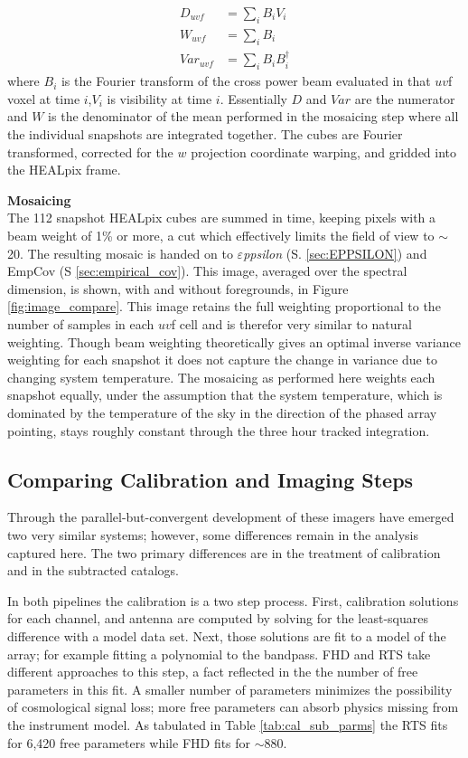\documentclass[twolcolumn,iop]{emulateapj}
\def\eppsilon{{\it $\varepsilon$ppsilon}}
\def\empirical{EmpCov}
\begin{document}
\begin{equation}
\label{eq:weight_accumulation}
\begin{split}
D_{uvf} &= \sum_i B_i V_i\\
W_{uvf} &= \sum_i B_i\\
Var_{uvf} &= \sum_i B_i B_i^\dag
\end{split}
\end{equation}
where $B_i$ is the Fourier transform of the cross power beam evaluated in that $uv$f voxel at time $i$,$V_i$ is visibility at time $i$. Essentially $D$ and $Var$ are the numerator and $W$ is the denominator of the mean performed in the mosaicing step where all the individual snapshots are integrated together.  The cubes are Fourier transformed, corrected for the $w$ projection coordinate warping, and gridded into the HEALpix frame.

{\bf Mosaicing}\\
 The 112 snapshot HEALpix cubes are summed in time, keeping pixels with a beam weight of 1\% or more, a cut which effectively limits the field of view to $\sim$20\arcdeg. The resulting mosaic is handed on to \eppsilon{} (S. \ref{sec:EPPSILON}) and  \empirical{} (S \ref{sec:empirical_cov}).  This image, averaged over the spectral dimension, is shown, with and without foregrounds, in Figure \ref{fig:image_compare}. This image retains the full weighting proportional to the number of samples in each $uv$f cell and is therefor very similar to natural weighting. Though beam weighting theoretically gives an optimal inverse variance weighting for each snapshot it does not capture the change in variance due to changing system temperature. The mosaicing as performed here weights each snapshot equally, under the assumption that the system temperature, which is dominated by the temperature of the sky in the direction of the phased array pointing, stays roughly constant through the three hour tracked integration.



\subsection{Comparing Calibration and Imaging Steps}
\label{sec:comparing_imaging}
Through the parallel-but-convergent development of these imagers have emerged two very similar systems; however, some differences remain in the analysis captured here. The two primary differences are in the treatment of calibration and in the subtracted catalogs.  

In both pipelines the calibration is a two step process. First, calibration solutions for each channel, and antenna are computed by solving for the least-squares difference with a model data set. Next, those solutions are fit to a model of the array; for example fitting a polynomial to the bandpass. FHD and RTS take different approaches to this step, a fact reflected in the the number of free parameters in this fit. A smaller number of parameters minimizes the possibility of cosmological signal loss; more free parameters can absorb physics missing from the instrument model.  As tabulated in Table \ref{tab:cal_sub_parms} the RTS fits for 6,420 free parameters while FHD fits for $\sim$880.  	
\end{document}
